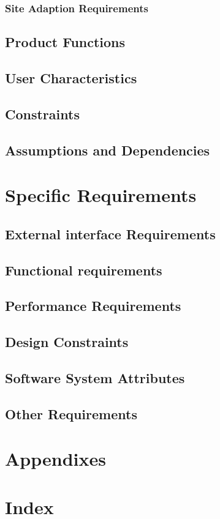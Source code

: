 \documentclass[12pt]{article}
\begin{document}
	\subsubsection{Site Adaption Requirements}
	\subsection{Product Functions}
	\subsection{User Characteristics}
	\subsection{Constraints}
	\subsection{Assumptions and Dependencies}
	\section{Specific Requirements}
	\subsection{External interface Requirements}
	\subsection{Functional requirements}
	\subsection{Performance Requirements}
	
	\subsection{Design Constraints}
	\subsection{Software System Attributes}
	\subsection{Other Requirements}
	\section{Appendixes}
	\section{Index}
\end{document}
